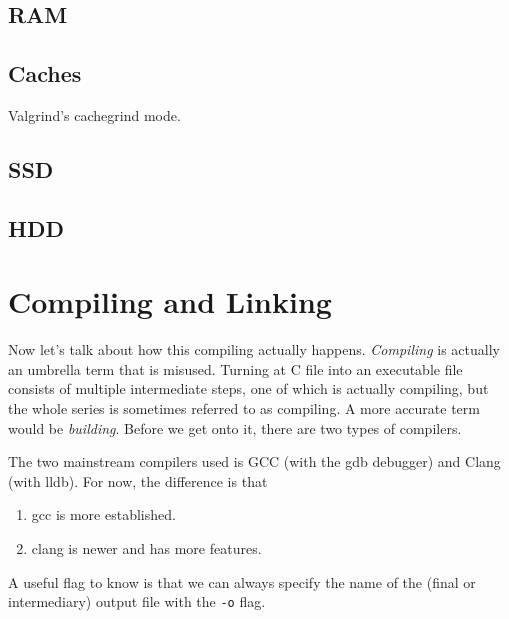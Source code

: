 \documentclass{article}
\begin{document}
  \subsection{RAM}

  \subsection{Caches}

    Valgrind's cachegrind mode. 

  \subsection{SSD}

  \subsection{HDD}

\section{Compiling and Linking}

  Now let's talk about how this compiling actually happens. \textit{Compiling} is actually an umbrella term that is misused. Turning at C file into an executable file consists of multiple intermediate steps, one of which is actually compiling, but the whole series is sometimes referred to as compiling. A more accurate term would be \textit{building}. Before we get onto it, there are two types of compilers. 

  \begin{definition}
    The two mainstream compilers used is GCC (with the gdb debugger) and Clang (with lldb). For now, the difference is that 
    \begin{enumerate}
      \item gcc is more established. 
      \item clang is newer and has more features. 
    \end{enumerate}
    A useful flag to know is that we can always specify the name of the (final or intermediary) output file with the \texttt{-o} flag. 
  \end{definition}
\end{document}
